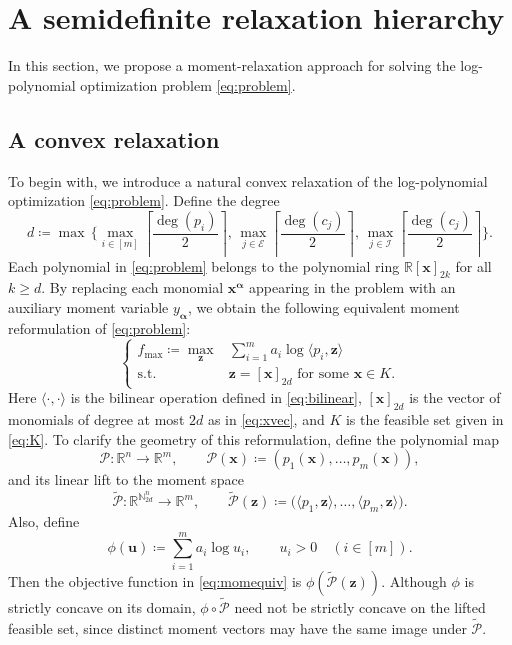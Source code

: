 \documentclass[pdflatex,sn-mathphys-num]{sn-jnl}%
\newcommand{\re}{\mathbb{R}}
\newcommand{\rd}[1]{{\color{red}#1}}
\newcommand{\vect}[1]{\boldsymbol{#1}}
\newcommand{\st}{\mathrm{s.t.}}
\theoremstyle{thmstyleone}%
\theoremstyle{thmstyletwo}%
\theoremstyle{thmstylethree}%
\begin{document}
\section{A semidefinite relaxation hierarchy}
\label{sec:rel}



In this section, we propose a moment-relaxation approach for
solving the log-polynomial optimization problem
\eqref{eq:problem}.

\subsection{A convex relaxation}
To begin with, we introduce a natural convex relaxation of the 
log-polynomial optimization \eqref{eq:problem}.
Define the degree
\begin{equation}\label{eq:d0d}
	d  \coloneqq  \max\,\Big\{ 
	\max_{i\in[m]}\left\lceil \frac{\deg(p_i)}{2}\right\rceil, 
	\, \max_{j\in\mathcal{E}}\left\lceil\frac{\deg(c_j)}{2}\right\rceil,
	\, \max_{j\in\mathcal{I}}\left\lceil\frac{\deg(c_j)}{2}\right\rceil \Big\}.
\end{equation}
Each polynomial in \eqref{eq:problem} belongs to the polynomial ring $\re[\vect{x}]_{2k}$ for all $k\ge d$.
By replacing each monomial $\vect{x}^{\vect{\alpha}}$ appearing
in the problem with an auxiliary moment variable
$y_{\vect{\alpha}}$,
we obtain the following equivalent moment reformulation of \eqref{eq:problem}:
\begin{equation}\label{eq:momequiv}
	\left\{\begin{array}{rl}
		f_{\max}\coloneqq \max\limits_{\vect{z}} & \sum\limits_{i=1}^m a_i \log \langle p_i, \vect{z}\rangle\\
		\st & \vect{z} = [\vect{x}]_{2d}\mbox{ for some $\vect{x}\in K$}.
	\end{array}
	\right.
\end{equation}
Here $\langle \cdot , \cdot \rangle$ is the bilinear operation 
defined in \eqref{eq:bilinear}, 
$[\vect{x}]_{2d}$ is the vector of monomials of degree at most
$2d$ as in \eqref{eq:xvec},
and $K$ is the feasible set given in \eqref{eq:K}.
\rd{To clarify the geometry of this reformulation, define the polynomial map
\[
\mathcal{P}:\mathbb{R}^n\to\mathbb{R}^m,\qquad
\mathcal{P}(\vect{x})\coloneqq(p_1(\vect{x}),\ldots,p_m(\vect{x})),
\]
and its linear lift to the moment space
\[
\widetilde{\mathcal{P}}:
\mathbb{R}^{\mathbb{N}_{2d}^n}\to\mathbb{R}^m,\qquad
\widetilde{\mathcal{P}}(\vect{z})
\coloneqq
\big(\langle p_1,\vect{z}\rangle,\ldots,\langle p_m,\vect{z}\rangle\big).
\]
Also, define
\[
\phi(\vect{u})\coloneqq\sum_{i=1}^m a_i\log u_i,
\qquad u_i>0\quad(i\in[m]).
\]
Then the objective function in \eqref{eq:momequiv} is
$\phi(\widetilde{\mathcal{P}}(\vect{z}))$.
Although $\phi$ is strictly concave on its domain,
$\phi\circ\widetilde{\mathcal{P}}$ need not be strictly concave
on the lifted feasible set, since distinct moment vectors may have
the same image under $\widetilde{\mathcal{P}}$.}
\end{document}
